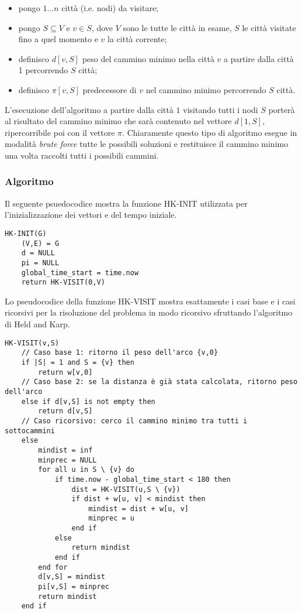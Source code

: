 \begin{itemize}
    \item  pongo \(1 \dots n\) città (i.e. nodi) da visitare;
    \item  pongo \(S \subseteq V\) e \(v \in S\), dove \(V\) sono le tutte le città in esame, \(S\) le città visitate fino a quel momento e \(v\) la città corrente;

\item definisco \(d[v, S]\) peso del cammino minimo nella città \(v\) a partire dalla città 1 percorrendo \(S\) città;
\item definisco \(\pi[v, S]\) predecessore di \(v\) nel cammino minimo percorrendo \(S\) città.
\end{itemize}

L'esecuzione dell'algoritmo a partire dalla città \(1\) visitando tutti i nodi \(S\) porterà al risultato del cammino minimo che sarà contenuto nel vettore \(d[1, S]\), ripercorribile poi con il vettore \(\pi\). Chiaramente questo tipo di algoritmo esegue in modalità \textit{brute force} tutte le possibili soluzioni e restituisce il cammino minimo una volta raccolti tutti i possibili cammini.

\subsubsection{Algoritmo}

Il seguente psuedocodice mostra la funzione HK-INIT utilizzata per l'inizializzazione dei vettori e del tempo iniziale. 
\begin{verbatim}
HK-INIT(G)
    (V,E) = G
    d = NULL
    pi = NULL
    global_time_start = time.now
    return HK-VISIT(0,V)
\end{verbatim}    

Lo pseudocodice della funzione HK-VISIT mostra esattamente i casi base e i casi ricorsivi per la risoluzione del problema in modo ricorsivo sfruttando l'algoritmo di Held and Karp.
\begin{verbatim}
HK-VISIT(v,S)
    // Caso base 1: ritorno il peso dell'arco {v,0}
    if |S| = 1 and S = {v} then 
        return w[v,0]
    // Caso base 2: se la distanza è già stata calcolata, ritorno peso dell'arco
    else if d[v,S] is not empty then 
        return d[v,S]
    // Caso ricorsivo: cerco il cammino minimo tra tutti i sottocammini
    else
        mindist = inf
        minprec = NULL
        for all u in S \ {v} do
            if time.now - global_time_start < 180 then
                dist = HK-VISIT(u,S \ {v})
                if dist + w[u, v] < mindist then
                    mindist = dist + w[u, v]
                    minprec = u
                end if
            else
                return mindist
            end if
        end for
        d[v,S] = mindist
        pi[v,S] = minprec
        return mindist
    end if
\end{verbatim}


